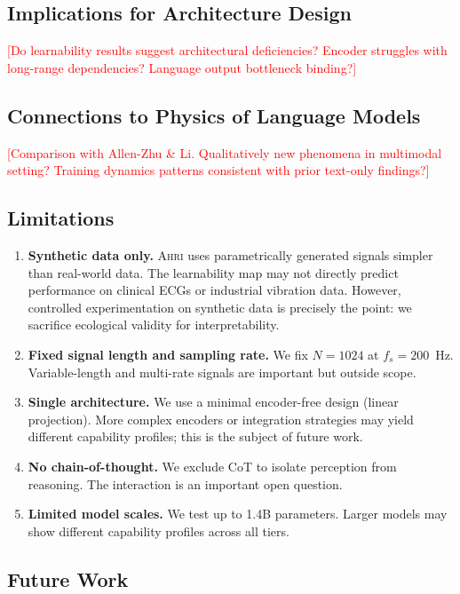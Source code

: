 \documentclass[11pt]{article}
\newcommand{\ahri}{\textsc{Ahri}}
\newcommand{\placeholder}[1]{\textcolor{red}{[#1]}}
\begin{document}
\subsection{Implications for Architecture Design}

\placeholder{Do learnability results suggest architectural deficiencies? Encoder struggles with long-range dependencies? Language output bottleneck binding?}

\subsection{Connections to Physics of Language Models}

\placeholder{Comparison with Allen-Zhu \& Li. Qualitatively new phenomena in multimodal setting? Training dynamics patterns consistent with prior text-only findings?}

\subsection{Limitations}

\begin{enumerate}[leftmargin=*]
    \item \textbf{Synthetic data only.} \ahri{} uses parametrically generated signals simpler than real-world data. The learnability map may not directly predict performance on clinical ECGs or industrial vibration data. However, controlled experimentation on synthetic data is precisely the point: we sacrifice ecological validity for interpretability.
    \item \textbf{Fixed signal length and sampling rate.} We fix $N=1024$ at $f_s=200$~Hz. Variable-length and multi-rate signals are important but outside scope.
    \item \textbf{Single architecture.} We use a minimal encoder-free design (linear projection). More complex encoders or integration strategies may yield different capability profiles; this is the subject of future work.
    \item \textbf{No chain-of-thought.} We exclude CoT to isolate perception from reasoning. The interaction is an important open question.
    \item \textbf{Limited model scales.} We test up to 1.4B parameters. Larger models may show different capability profiles across all tiers.
\end{enumerate}

\subsection{Future Work}
\end{document}
